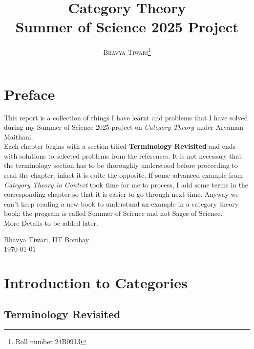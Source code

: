 \documentclass{scrbook}
\author{\textsc{Bhavya Tiwari}\thanks{Roll number \textsc{24B0913}}}
\title{Category Theory \\[5mm]
\Large Summer of Science 2025 Project}
\theoremstyle{definition}\newtheorem{defn}{Definition}
\theoremstyle{definition}\newtheorem*{rmk}{Remark}
\newcommand{\Chapter}[1]{\chapter*{#1}\addcontentsline{toc}{chapter}{#1}}
\newcommand{\hi}[1]{{\color{blue}\textbf{#1}}}
\begin{document}
\maketitle
\tableofcontents

\Chapter{Preface}

This report is a collection of things I have learnt and problems that I have
solved during my Summer of Science 2025 project on \emph{Category Theory} under
Aryaman Maithani.
\\[2mm]
Each chapter begins with a section titled \hi{Terminology Revisited} and ends
with solutions to selected problems from the references. It is not necessary
that the terminology section has to be thoroughly understood before proceeding
to read the chapter; infact it is quite the opposite. If some advanced example
from \emph{Category Theory in Context} took time for me to process, I add some
terms in the corresponding chapter so that it is easier to go through next time.
Anyway we can't keep reading a new book to understand an example in a category
theory book; the program is called Summer of Science and not Sages of Science.
\\[2mm]
More Details to be added later.

\bigskip\noindent
Bhavya Tiwari, IIT Bombay \\
\monthyear\today

\chapter{Introduction to Categories}
\section*{Terminology Revisited}
\end{document}
